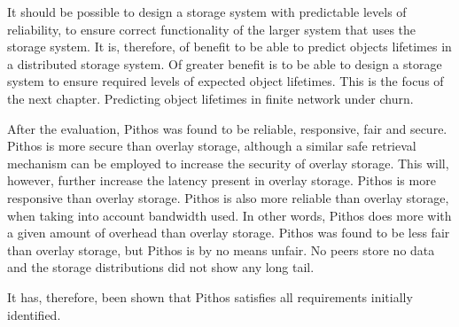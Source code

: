 It should be possible to design a storage system with predictable levels of reliability, to ensure correct functionality of the larger system that uses the storage system. It is, therefore, of benefit to be able to predict objects lifetimes in a distributed storage system. Of greater benefit is to be able to design a storage system to ensure required levels of expected object lifetimes. This is the focus of the next chapter. Predicting object lifetimes in finite network under churn.

After the evaluation, Pithos was found to be reliable, responsive, fair and secure. Pithos is more secure than overlay storage, although a similar safe retrieval mechanism can be employed to increase the security of overlay storage. This will, however, further increase the latency present in overlay storage. Pithos is more responsive than overlay storage. Pithos is also more reliable than overlay storage, when taking into account bandwidth used. In other words, Pithos does more with a given amount of overhead than overlay storage. Pithos was found to be less fair than overlay storage, but Pithos is by no means unfair. No peers store no data and the storage distributions did not show any long tail.

It has, therefore, been shown that Pithos satisfies all requirements initially identified. 